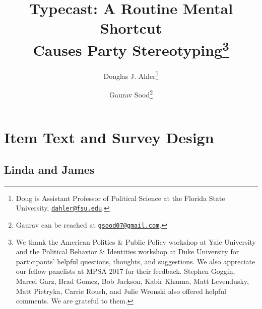\documentclass[12pt, letterpaper]{article}
\title{Typecast: A Routine Mental Shortcut \\ Causes Party Stereotyping\footnote{We thank the American Politics \& Public Policy workshop at Yale University and the Political Behavior \& Identities workshop at Duke University for participants' helpful questions, thoughts, and suggestions. We also appreciate our fellow panelists at MPSA 2017 for their feedback. Stephen Goggin, Marcel Garz, Brad Gomez, Bob Jackson, Kabir Khanna, Matt Levendusky, Matt Pietryka, Carrie Roush, and Julie Wronski also offered helpful comments. We are grateful to them.}}
\author{Douglas J. Ahler\thanks{Doug is Assistant Professor of Political Science at the Florida State University, \href{mailto:dahler@fsu.edu}{\texttt{dahler@fsu.edu}}.} \and Gaurav Sood\thanks{Gaurav can be reached at \href{mailto:gsood07@gmail.com}{\texttt{gsood07@gmail.com}}.}}
\begin{document}
\maketitle

\newpage
\doublespacing

\renewcommand{\thesection}{SI \arabic{section}}
\renewcommand\thetable{\thesection.\arabic{table}}  
\renewcommand\thefigure{\thesection.\arabic{figure}}

\section{Item Text and Survey Design}

\subsection{Linda and James}
\end{document}
